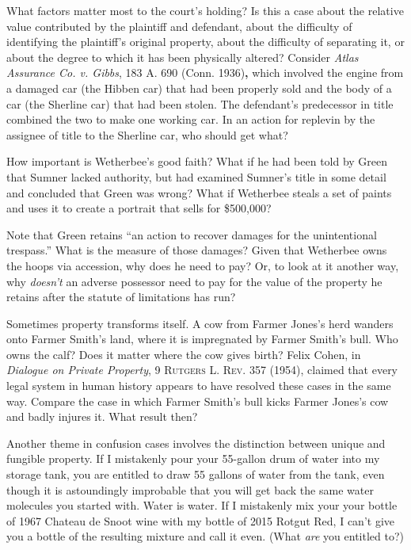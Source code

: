 
\item What factors matter most to the court's holding? Is this a case about the
relative value contributed by the plaintiff and defendant, about the difficulty
of identifying the plaintiff's original property, about the difficulty of
separating it, or about the degree to which it has been physically altered?
Consider \textit{Atlas Assurance Co. v. Gibbs}, 183 A. 690 (Conn.
1936)\textbf{, }which involved the engine from a damaged car (the Hibben car)
that had been properly sold and the body of a car (the Sherline car) that had
been stolen. The defendant's predecessor in title combined the two to make one
working car. In an action for replevin by the assignee of title to the Sherline
car, who should get what?


\item How important is Wetherbee's good faith? What if he had been told by Green
that Sumner lacked authority, but had examined Sumner's title in some detail
and concluded that Green was wrong? What if Wetherbee steals a set of paints
and uses it to create a portrait that sells for \$500,000?


\item Note that Green retains ``an action to recover damages for the
unintentional trespass.'' What is the measure of those damages? Given that
Wetherbee owns the hoops via accession, why does he need to pay? Or, to look
at it another way, why \textit{doesn't} an adverse possessor need to pay for
the value of the property he retains after the statute of limitations has run?


\item Sometimes property transforms itself. A cow from Farmer Jones's herd
wanders onto Farmer Smith's land, where it is impregnated by Farmer Smith's
bull. Who owns the calf? Does it matter where the cow gives birth? Felix Cohen,
in \textit{Dialogue on Private Property}, 9 \textsc{Rutgers
L. Rev.} 357 (1954), claimed that every legal system in human history appears
to have resolved these cases in the same way. Compare the case in which Farmer
Smith's bull kicks Farmer Jones's cow and badly injures it. What result then?


\item \label{wetherbee-v-green-q-fungible}
Another theme in confusion cases involves the distinction between unique
and fungible property. If I mistakenly pour your 55-gallon drum of water into
my storage tank, you are entitled to draw 55 gallons of water from the tank,
even though it is astoundingly improbable that you will get back the same water
molecules you started with. Water is water. If I mistakenly mix your your
bottle of 1967 Chateau de Snoot wine with my bottle of 2015 Rotgut Red, I can't
give you a bottle of the resulting mixture and call it even. (What \textit{are}
you entitled to?) 

